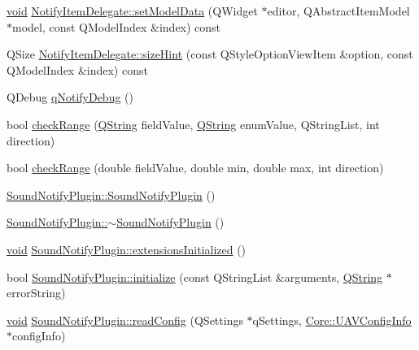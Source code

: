 \begin{DoxyCompactItemize}
\item 
\hyperlink{group___u_a_v_objects_plugin_ga444cf2ff3f0ecbe028adce838d373f5c}{void} \hyperlink{group___notify_plugin_gacd6ffc2f5989d0a64c398e6604d72e8e}{\-Notify\-Item\-Delegate\-::set\-Model\-Data} (\-Q\-Widget $\ast$editor, \-Q\-Abstract\-Item\-Model $\ast$model, const \-Q\-Model\-Index \&index) const 
\item 
\-Q\-Size \hyperlink{group___notify_plugin_ga5529e9472e4132a0066755c88969323b}{\-Notify\-Item\-Delegate\-::size\-Hint} (const \-Q\-Style\-Option\-View\-Item \&option, const \-Q\-Model\-Index \&index) const 
\item 
\-Q\-Debug \hyperlink{group___notify_plugin_gaa12b557f54e20bfddabd963a0eccbaac}{q\-Notify\-Debug} ()
\item 
bool \hyperlink{group___notify_plugin_ga0173f54afe75735a4e4e7cdca2842f4c}{check\-Range} (\hyperlink{group___u_a_v_objects_plugin_gab9d252f49c333c94a72f97ce3105a32d}{\-Q\-String} field\-Value, \hyperlink{group___u_a_v_objects_plugin_gab9d252f49c333c94a72f97ce3105a32d}{\-Q\-String} enum\-Value, \-Q\-String\-List, int direction)
\item 
bool \hyperlink{group___notify_plugin_ga217a28e0d56a684ecdd678af52024bae}{check\-Range} (double field\-Value, double min, double max, int direction)
\item 
\hyperlink{group___notify_plugin_ga4ac47c6cde68d633ead0764296f9a737}{\-Sound\-Notify\-Plugin\-::\-Sound\-Notify\-Plugin} ()
\item 
\hyperlink{group___notify_plugin_ga41104bb06fbf94801a798514294d39c3}{\-Sound\-Notify\-Plugin\-::$\sim$\-Sound\-Notify\-Plugin} ()
\item 
\hyperlink{group___u_a_v_objects_plugin_ga444cf2ff3f0ecbe028adce838d373f5c}{void} \hyperlink{group___notify_plugin_gad704ab0c43392e54f01882f7883f689f}{\-Sound\-Notify\-Plugin\-::extensions\-Initialized} ()
\item 
bool \hyperlink{group___notify_plugin_ga5c84bbeb8237b65ecce93f518a26384d}{\-Sound\-Notify\-Plugin\-::initialize} (const \-Q\-String\-List \&arguments, \hyperlink{group___u_a_v_objects_plugin_gab9d252f49c333c94a72f97ce3105a32d}{\-Q\-String} $\ast$error\-String)
\item 
\hyperlink{group___u_a_v_objects_plugin_ga444cf2ff3f0ecbe028adce838d373f5c}{void} \hyperlink{group___notify_plugin_gae783274f70106d7f8a50f51b4d98221f}{\-Sound\-Notify\-Plugin\-::read\-Config} (\-Q\-Settings $\ast$q\-Settings, \hyperlink{class_core_1_1_u_a_v_config_info}{\-Core\-::\-U\-A\-V\-Config\-Info} $\ast$config\-Info)

\end{DoxyCompactItemize}
